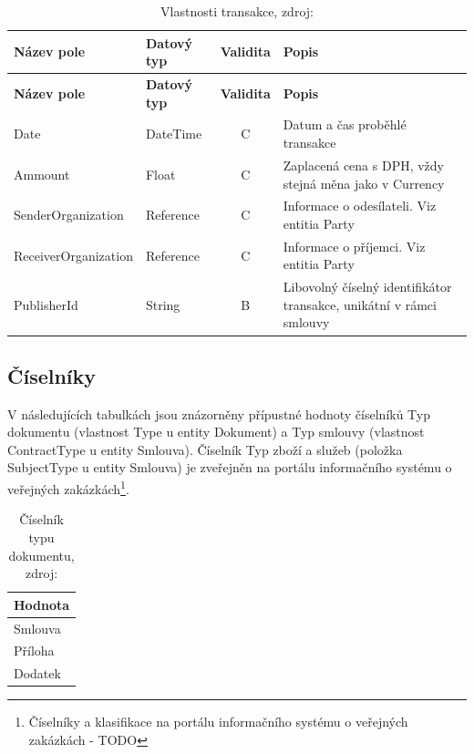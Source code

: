 \begin{center}
\begin{longtable}{lp{20mm}cp{65mm}}
\label{grid_mlmmh} \\
\multicolumn{1}{l}{\textbf{Název pole}} & 
\multicolumn{1}{l}{\textbf{Datový typ}} & 
\multicolumn{1}{l}{\textbf{Validita}} & 
\multicolumn{1}{l}{\textbf{Popis}} \\ \hline 
\endfirsthead
\multicolumn{1}{l}{\textbf{Název pole}} & 
\multicolumn{1}{l}{\textbf{Datový typ}} & 
\multicolumn{1}{l}{\textbf{Validita}} & 
\multicolumn{1}{l}{\textbf{Popis}} \\ \hline 
\hline
\endhead
\endfoot
\caption{Vlastnosti transakce, zdroj:\protect\cite{metodika}}
\endlastfoot
\rowcolor{validateC}Date & DateTime & C & Datum a čas proběhlé transakce \\
\rowcolor{validateC}Ammount & Float & C & Zaplacená cena s DPH, vždy stejná měna jako v Currency \\
\rowcolor{validateC}SenderOrganization & Reference & C & Informace o odesílateli. Viz entitia Party \\
\rowcolor{validateC}ReceiverOrganization & Reference & C & Informace o příjemci. Viz entitia Party \\
\rowcolor{validateB}PublisherId & String & B & Libovolný číselný identifikátor transakce, unikátní v rámci smlouvy \\
\end{longtable}
\end{center}

\subsection{Číselníky}

V následujících tabulkách jsou znázorněny přípustné hodnoty číselníků Typ dokumentu (vlastnost Type u entity Dokument) a Typ smlouvy (vlastnost ContractType u entity Smlouva). Číselník Typ zboží a služeb (položka SubjectType u entity Smlouva) je zveřejněn na portálu informačního systému o veřejných zakázkách\footnote{Číselníky a klasifikace na portálu informačního systému o veřejných zakázkách - TODO}.

\begin{table}[h]
\centering
\begin{tabular}{l}
\textbf{Hodnota} \\
\hline
\rowcolor{validateB}Smlouva \\
\rowcolor{validateB}Příloha \\
\rowcolor{validateB}Dodatek \\
\end{tabular}
\caption{Číselník typu dokumentu, zdroj:\protect\cite{metodika}}
\end{table}

